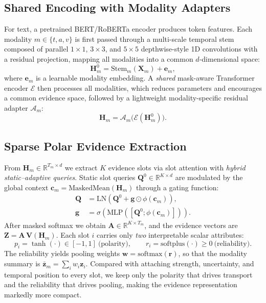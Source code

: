 \documentclass[conference]{IEEEtran}
\begin{document}
\subsection{Shared Encoding with Modality Adapters}
For text, a pretrained BERT/RoBERTa encoder produces token features. Each modality
$m \in \{t,a,v\}$ is first passed through a multi-scale temporal stem composed of
parallel $1\times1$, $3\times3$, and $5\times5$ depthwise-style 1D convolutions
with a residual projection, mapping all modalities into a common $d$-dimensional
space:
\begin{equation}
\mathbf{H}_m^{0} = \mathrm{Stem}_m(\mathbf{X}_m) + \mathbf{e}_m,
\end{equation}
where $\mathbf{e}_m$ is a learnable modality embedding. A \emph{shared}
mask-aware Transformer encoder $\mathcal{E}$ then processes all modalities, which
reduces parameters and encourages a common evidence space, followed by a
lightweight modality-specific residual adapter $\mathcal{A}_m$:
\begin{equation}
\mathbf{H}_m = \mathcal{A}_m\big(\mathcal{E}(\mathbf{H}_m^{0})\big).
\end{equation}

\subsection{Sparse Polar Evidence Extraction}
From $\mathbf{H}_m \in \mathbb{R}^{T_m \times d}$ we extract $K$ evidence slots via
slot attention with \emph{hybrid static--adaptive queries}. Static slot queries
$\mathbf{Q}^{0}\in\mathbb{R}^{K\times d}$ are modulated by the global context
$\mathbf{c}_m = \mathrm{MaskedMean}(\mathbf{H}_m)$ through a gating function:
\begin{align}
\mathbf{Q} &= \mathrm{LN}\!\left(\mathbf{Q}^{0} + \bm{g}\odot \phi(\mathbf{c}_m)\right),\\
\bm{g} &= \sigma\!\left(\mathrm{MLP}([\mathbf{Q}^{0};\phi(\mathbf{c}_m)])\right).
\end{align}
After masked softmax we obtain $\mathbf{A}\in\mathbb{R}^{K\times T_m}$, and the
evidence vectors are $\mathbf{Z} = \mathbf{A}\,\mathbf{V}(\mathbf{H}_m)$. Each slot
$i$ carries only \emph{two} interpretable scalar attributes:
\begin{equation}
p_i = \tanh(\cdot)\in[-1,1]\ \text{(polarity)}, \qquad
r_i = \mathrm{softplus}(\cdot)\ge 0\ \text{(reliability)}.
\end{equation}
The reliability yields pooling weights $\bm{w} = \mathrm{softmax}(\bm{r})$, so that
the modality summary is $\bar{\mathbf{z}}_m = \sum_i w_i \mathbf{z}_i$. Compared with
attaching strength, uncertainty, and temporal position to every slot, we keep only
the polarity that drives transport and the reliability that drives pooling, making
the evidence representation markedly more compact.
\end{document}
